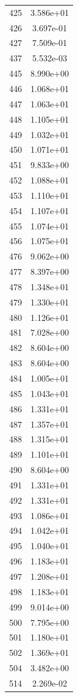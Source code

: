 \documentclass[12pt]{article}
\begin{document}
\begin{longtable}{@{}cc@{}}
425 & 3.586e+01 \\
426 & 3.697e-01 \\
427 & 7.509e-01 \\
437 & 5.532e-03 \\
445 & 8.990e+00 \\
446 & 1.068e+01 \\
447 & 1.063e+01 \\
448 & 1.105e+01 \\
449 & 1.032e+01 \\
450 & 1.071e+01 \\
451 & 9.833e+00 \\
452 & 1.088e+01 \\
453 & 1.110e+01 \\
454 & 1.107e+01 \\
455 & 1.074e+01 \\
456 & 1.075e+01 \\
476 & 9.062e+00 \\
477 & 8.397e+00 \\
478 & 1.348e+01 \\
479 & 1.330e+01 \\
480 & 1.126e+01 \\
481 & 7.028e+00 \\
482 & 8.604e+00 \\
483 & 8.604e+00 \\
484 & 1.005e+01 \\
485 & 1.043e+01 \\
486 & 1.331e+01 \\
487 & 1.357e+01 \\
488 & 1.315e+01 \\
489 & 1.101e+01 \\
490 & 8.604e+00 \\
491 & 1.331e+01 \\
492 & 1.331e+01 \\
493 & 1.086e+01 \\
494 & 1.042e+01 \\
495 & 1.040e+01 \\
496 & 1.183e+01 \\
497 & 1.208e+01 \\
498 & 1.183e+01 \\
499 & 9.014e+00 \\
500 & 7.795e+00 \\
501 & 1.180e+01 \\
502 & 1.369e+01 \\
504 & 3.482e+00 \\
514 & 2.269e-02 \\

\end{longtable}
\end{document}
